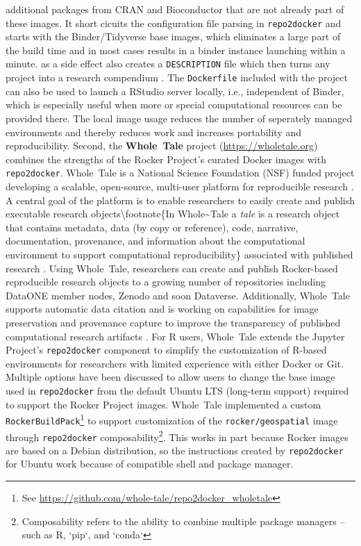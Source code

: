 additional packages from CRAN and Bioconductor that are not already part
of these images. It short cicuits the configuration file parsing in
\texttt{repo2docker} and starts with the Binder/Tidyverse base images,
which eliminates a large part of the build time and in most cases
results in a binder instance launching within a minute. 
as a side effect also creates a \texttt{DESCRIPTION} file which then
turns any project into a research compendium
\citep{marwick_packaging_2018}. The \texttt{Dockerfile} included with
the project can also be used to launch a RStudio server locally, i.e.,
independent of Binder, which is especially useful when more or special
computational resources can be provided there. The local image usage
reduces the number of seperately managed environments and thereby
reduces work and increases portability and reproducibility. Second, the
\textbf{Whole~Tale} project (\url{https://wholetale.org}) combines the
strengths of the Rocker Project's curated Docker images with
\texttt{repo2docker}. Whole~Tale is a National Science Foundation (NSF)
funded project developing a scalable, open-source, multi-user platform
for reproducible research \citep{brinckman2019, chard2019a}. A central
goal of the platform is to enable researchers to easily create and
publish executable research objects\textbackslash{}footnote\{In
Whole\textasciitilde{}Tale a \emph{tale} is a research object that
contains metadata, data (by copy or reference), code, narrative,
documentation, provenance, and information about the computational
environment to support computational reproducibility\} associated with
published research \citep{chard2019b}. Using Whole~Tale, researchers can
create and publish Rocker-based reproducible research objects to a
growing number of repositories including DataONE member nodes, Zenodo
and soon Dataverse. Additionally, Whole~Tale supports automatic data
citation and is working on capabilities for image preservation and
provenance capture to improve the transparency of published
computational research artifacts \citep{mecum2018, mcphillips2019}. For
R users, Whole~Tale extends the Jupyter Project's \texttt{repo2docker}
component to simplify the customization of R-based environments for
researchers with limited experience with either Docker or Git. Multiple
options have been discussed to allow users to change the base image used
in \texttt{repo2docker} from the default Ubuntu LTS (long-term support)
required to support the Rocker Project images. Whole~Tale implemented a
custom
\texttt{RockerBuildPack}\footnote{See \href{https://github.com/whole-tale/repo2docker\_wholetale}{https://github.com/whole-tale/repo2docker\_wholetale}}
to support customization of the \texttt{rocker/geospatial} image through
\texttt{repo2docker}
composability\footnote{Composability refers to the ability to combine multiple package managers -- such as R, `pip`, and `conda`}.
This works in part because Rocker images are based on a Debian
distribution, so the instructions created by \texttt{repo2docker} for
Ubuntu work because of compatible shell and package manager.

